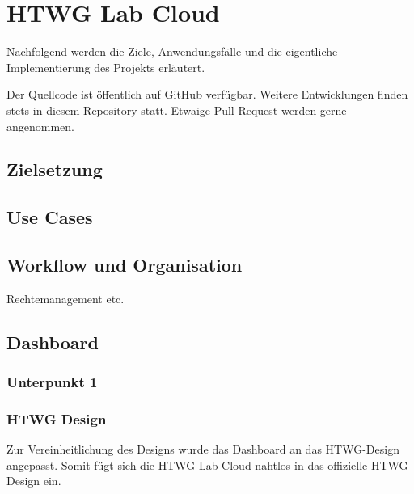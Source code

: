 \chapter{HTWG Lab Cloud}

Nachfolgend werden die Ziele, Anwendungsfälle und die eigentliche Implementierung des Projekts erläutert.

Der Quellcode ist öffentlich auf GitHub \cite{git-source} verfügbar. Weitere Entwicklungen finden stets in diesem Repository statt. Etwaige Pull-Request werden gerne angenommen.

\section{Zielsetzung}

\section{Use Cases}

\section{Workflow und Organisation}

Rechtemanagement etc.

\section{Dashboard}

\subsection{Unterpunkt 1}

\subsection{HTWG Design}

Zur Vereinheitlichung des Designs wurde das Dashboard an das HTWG-Design angepasst. Somit fügt sich die HTWG Lab Cloud nahtlos in das offizielle HTWG Design ein.

